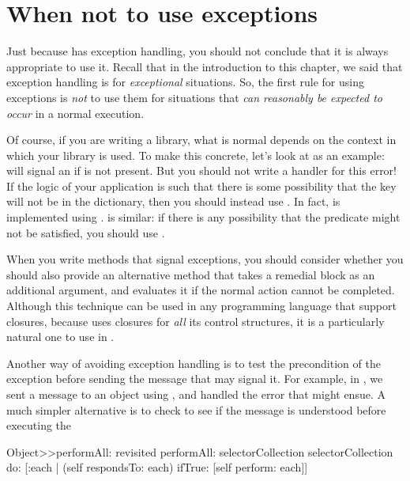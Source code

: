 \documentclass[a4paper,10pt,twoside]{book}
\begin{document}
\section{When not to use exceptions}
Just because \pharo{} has exception handling, you should not conclude that it is always appropriate to use it.  
Recall that in the introduction to this chapter, we said that exception handling is for \emph{exceptional} situations.  
So, the first rule for using exceptions is \emph{not} to use them for situations that \emph{can reasonably be expected to occur} in a normal execution. 

Of course, if you are writing a library, what is normal depends on the context in which your library is used.
To make this concrete, let's look at  as an example:
 will signal an  if  is not present.
But you should not write a handler for this error!
If the logic of your application is such that there is some possibility that the key will not be in the dictionary, then you should instead use .
In fact,  is implemented using .
 is similar: if there is any possibility that the predicate might not be satisfied, you should use . 

When you write methods that signal exceptions, you should consider whether you should also provide an alternative method that takes a remedial block as an additional argument, and evaluates it if the normal action cannot be completed.  
Although this technique can be used in any programming language that support closures, because \st{} uses closures for \emph{all} its control structures, it is a particularly natural one to use in \st{}.

Another way of avoiding exception handling is to test the precondition of the exception before sending the message that may signal it.  For example, in , we sent a message to an object using , and handled the  error that might ensue.  A much simpler alternative is to check to see if the message is understood before executing the 

\begin{method}[simplerObjectPerfromAll]{Object>>performAll: revisited}
performAll: selectorCollection
	selectorCollection
		do: [:each | (self respondsTo: each)
				ifTrue: [self perform: each]]
\end{method}
\end{document}
